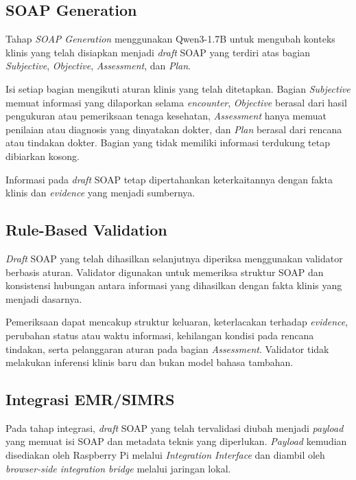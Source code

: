 \subsection{SOAP Generation}
\label{subsec:soapgeneration}

Tahap \emph{SOAP Generation} menggunakan Qwen3-1.7B untuk mengubah konteks klinis yang telah disiapkan menjadi \emph{draft} SOAP yang terdiri atas bagian \emph{Subjective}, \emph{Objective}, \emph{Assessment}, dan \emph{Plan}.

Isi setiap bagian mengikuti aturan klinis yang telah ditetapkan. Bagian \emph{Subjective} memuat informasi yang dilaporkan selama \emph{encounter}, \emph{Objective} berasal dari hasil pengukuran atau pemeriksaan tenaga kesehatan, \emph{Assessment} hanya memuat penilaian atau diagnosis yang dinyatakan dokter, dan \emph{Plan} berasal dari rencana atau tindakan dokter. Bagian yang tidak memiliki informasi terdukung tetap dibiarkan kosong.

Informasi pada \emph{draft} SOAP tetap dipertahankan keterkaitannya dengan fakta klinis dan \emph{evidence} yang menjadi sumbernya.

\subsection{Rule-Based Validation}
\label{subsec:rulebasedvalidation}

\emph{Draft} SOAP yang telah dihasilkan selanjutnya diperiksa menggunakan validator berbasis aturan. Validator digunakan untuk memeriksa struktur SOAP dan konsistensi hubungan antara informasi yang dihasilkan dengan fakta klinis yang menjadi dasarnya.

Pemeriksaan dapat mencakup struktur keluaran, keterlacakan terhadap \emph{evidence}, perubahan status atau waktu informasi, kehilangan kondisi pada rencana tindakan, serta pelanggaran aturan pada bagian \emph{Assessment}. Validator tidak melakukan inferensi klinis baru dan bukan model bahasa tambahan.

\subsection{Integrasi EMR/SIMRS}
\label{subsec:integrasiemr}

Pada tahap integrasi, \emph{draft} SOAP yang telah tervalidasi diubah menjadi \emph{payload} yang memuat isi SOAP dan metadata teknis yang diperlukan. \emph{Payload} kemudian disediakan oleh Raspberry Pi melalui \emph{Integration Interface} dan diambil oleh \emph{browser-side integration bridge} melalui jaringan lokal.

